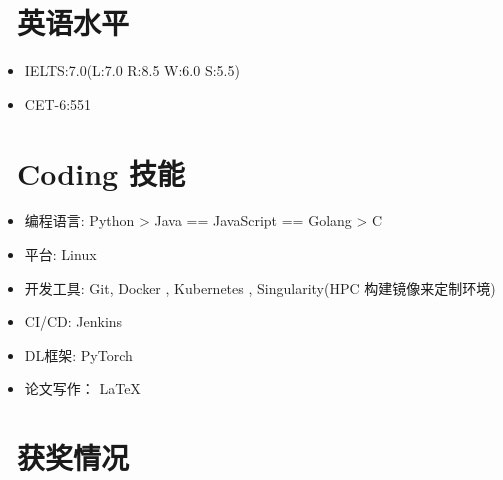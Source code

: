 \documentclass{resume}
\begin{document}
\section{\faInfo\ 英语水平}
\begin{itemize}[parsep=0.5ex]
  \item IELTS:7.0(L:7.0 R:8.5 W:6.0 S:5.5)
  \item CET-6:551
\end{itemize}

\section{\faCogs\ Coding 技能}
\begin{itemize}[parsep=0.5ex]
  \item 编程语言: Python > Java == JavaScript == Golang > C
  \item 平台: Linux
  \item 开发工具: Git, Docker , Kubernetes , Singularity(HPC 构建镜像来定制环境)
  \item CI/CD: Jenkins
  \item DL框架: PyTorch
  \item 论文写作： \LaTeX
\end{itemize}



\section{\faHeartO\ 获奖情况}


\end{document}
